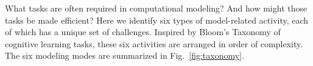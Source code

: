 \documentclass[journal abbreviation, manuscript]{copernicus}
\begin{document}
What tasks are often required in computational modeling? And how might those tasks be made efficient? Here we identify six types of model-related activity, each of which has a unique set of challenges. Inspired by Bloom's Taxonomy of cognitive learning tasks, these six activities are arranged in order of complexity. The six modeling modes are summarized in Fig.~\ref{fig:taxonomy}.

\end{document}
